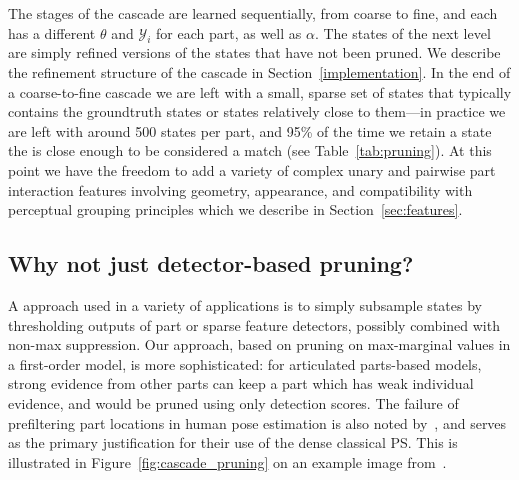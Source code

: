 The stages of the cascade are learned sequentially, from coarse to fine, and each has a different $\theta$ and $\mathcal{Y}_i$ for each part, as well as  $\alpha$.  The states of the next level are simply refined versions of the states that have not been pruned. We describe 
the refinement structure of the cascade in Section~\ref{implementation}.
In the end of a coarse-to-fine cascade we are left with a small, sparse set of states that typically contains the groundtruth states or states relatively close to them---in practice we are left with around 500 states per part, and 95\% of the time we retain a state the is close enough to be considered a match (see Table~\ref{tab:pruning}). At this point we have the freedom to add a variety of complex unary and pairwise part interaction features involving geometry, appearance, and compatibility with perceptual grouping principles which we describe in Section~\ref{sec:features}.

\subsection{Why not just detector-based pruning?} A \naive approach used in a 
variety of applications is to simply subsample states by thresholding outputs 
of part or sparse feature detectors, possibly combined with non-max 
suppression.  Our approach, based on pruning on max-marginal values in a 
first-order model, is more sophisticated: for articulated parts-based models, 
strong evidence from other parts can keep a part which has weak individual 
evidence, and would be pruned using only detection scores.  The failure of 
prefiltering  part locations in human pose estimation is also noted 
by~\cite{andriluka09}, and serves as the primary justification for their use of 
the dense classical PS.  This is illustrated in 
Figure~\ref{fig:cascade_pruning} on an example image from~\cite{ferrari08}.


